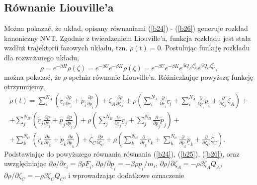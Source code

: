 \documentclass[12pt,a4paper,openright]{report} %
\begin{document}
\subsection{Równanie Liouville'a}
\label{rowlowNH}
Można pokazać, że układ, opisany równaniami (\ref{b24}) - (\ref{b26}) generuje rozkład kanoniczny NVT.
Zgodnie z twierdzeniem Liouville'a, funkcja rozkładu jest stała wzdłuż trajektorii fazowych układu, tzn. $\dot{\rho}(t)=0$. Postulując funkcję rozkładu dla rozważanego układu, 
\begin{equation}
\rho = e^{-\beta H} \rho(\zeta)=e^{-\beta U}e^{-\beta K}\rho(\zeta)=e^{-\beta U}e^{-\beta K} e^{\beta Q_A \zeta_A^2} e^{\beta Q_C \zeta_C^2},
\end{equation}
można pokazać, że $\rho$ spełnia równanie Liouville'a. 
Różniczkując powyższą funkcję otrzymujemy,
\begin{equation}
\begin{gathered}
\dot{\rho}(t)=\sum_{i}^{N_A}\left( \underline{\dot{r}}_i \frac{\partial \rho }{\partial \underline{r}_i } + \underline{\dot{p}}_i \frac{\partial \rho }{\partial \underline{p}_i }\right) + \dot{\zeta_A}\frac{\partial \rho}{\partial \zeta_A} + \rho \left( \sum_{i}^{N_A} \frac{\partial}{\partial \underline{r}_i} \underline{\dot{r}}_i + \sum_{i}^{N_A} \frac{\partial}{\partial \underline{p}_i} \underline{\dot{p}}_i +  \frac{\partial}{\partial \zeta_A} \dot{\zeta_A} \right)+ \\
%
%
%
+ \sum_{j}^{N_B}\left( \underline{\dot{r}}_j \frac{\partial \rho }{\partial \underline{r}_j } + \underline{\dot{p}}_j \frac{\partial \rho }{\partial \underline{p}_j }\right) + \rho \left( \sum_{j}^{N_B} \frac{\partial}{\partial \underline{r}_j} \underline{\dot{r}}_j + \sum_{j}^{N_B} \frac{\partial}{\partial \underline{p}_j} \underline{\dot{p}}_j \right)+\\
%
%
%
+\sum_{k}^{N_C}\left( \underline{\dot{r}}_k \frac{\partial \rho }{\partial \underline{r}_k } + \underline{\dot{p}}_k \frac{\partial \rho }{\partial \underline{p}_k }\right) + \dot{\zeta_C}\frac{\partial \rho}{\partial \zeta_C} + \rho \left( \sum_{k}^{N_C} \frac{\partial}{\partial \underline{r}_k} \underline{\dot{r}}_k + \sum_{k}^{N_C} \frac{\partial}{\partial \underline{p}_k} \underline{\dot{p}}_k +  \frac{\partial}{\partial \zeta_C} \dot{\zeta_C} \right).
\end{gathered}
\end{equation}
Podstawiając do powyższego równania równania (\ref{b24}), (\ref{b25}), (\ref{b26}), oraz uwzględniając $\partial \rho / \partial \underline{r}_i = \beta \rho \underline{F}_i$, $\partial \rho / \partial \underline{p}_i = -\beta \rho \underline{p}_i /m_i$, $\partial \rho / \partial \zeta_A = -\rho \beta \zeta_A Q_A$, $\partial \rho / \partial \zeta_C = -\rho \beta \zeta_C Q_C$, i wprowadzając dodatkowe oznaczenie 
\end{document}
